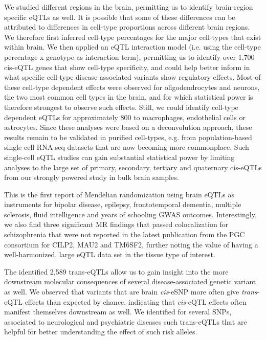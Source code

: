 {{We studied different regions in the brain, permitting us to identify brain-region specific eQTLs as well. It is possible that some of these differences can be attributed to differences in cell-type proportions across different brain regions. We therefore first inferred cell-type percentages for the major cell-types that exist within brain. We then applied an eQTL interaction model (i.e. using the cell-type percentage x genotype as interaction term), permitting us to identify over 1,700 cis-eQTL genes that show cell-type specificity, and could help better inform in what specific cell-type disease-associated variants show regulatory effects. Most of these cell-type dependent effects were observed for oligodendrocytes and neurons, the two most common cell types in the brain, and for which statistical power is therefore strongest to observe such effects. Still, we could identify cell-type dependent eQTLs for approximately 800 to macrophages, endothelial cells or astrocytes. Since these analyses were based on a deconvolution approach, these results remain to be validated in purified cell-types, e.g. from population-based single-cell RNA-seq datasets that are now becoming more commonplace\cite{wijstSinglecellRNASequencing2018,PopulationscaleSinglecellRNAseq}. Such single-cell eQTL studies can gain substantial statistical power by limiting analyses to the large set of primary, secondary, tertiary and quaternary cis-eQTLs from our strongly powered study in bulk brain samples. 

This is the first report of Mendelian randomization using brain eQTLs as instruments for bipolar disease, epilepsy, frontotemporal dementia, multiple sclerosis, fluid intelligence and years of schooling GWAS outcomes. Interestingly, we also find three significant MR findings that passed colocalization for schizophrenia that were not reported in the latest publication from the PGC consortium for CILP2, MAU2 and TM6SF2\cite{consortiumMappingGenomicLoci2020}, further noting the value of having a well-harmonized, large eQTL data set in the tissue type of interest.  

The identified 2,589 trans-eQTLs allow us to gain insight into the more downstream molecular consequences of several disease-associated genetic variant as well. We observed that variants that are brain \emph{cis}-eSNP more often give \emph{trans}-eQTL effects than expected by chance, indicating that \emph{cis}-eQTL effects often manifest themselves downstream as well. We identified for several SNPs, associated to neurological and psychiatric diseases such trans-eQTLs that are helpful for better understanding the effect of such risk alleles. 

}}
